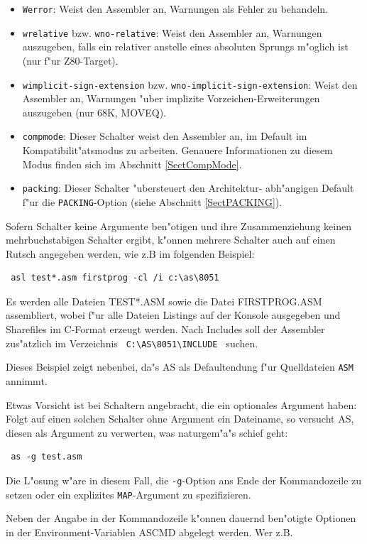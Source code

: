 \documentclass[12pt,a4paper,twoside]{report}
\newcommand{\tty}[1]{{\tt #1}}
\newcommand{\asname}{AS}
\begin{document}
\begin{itemize}
\item{{\tt Werror}: Weist den Assembler an, Warnungen als Fehler zu
      behandeln.}
\item{{\tt wrelative} bzw. {\tt wno-relative}: Weist den Assembler an,
      Warnungen auszugeben, falls ein relativer anstelle eines absoluten
      Sprungs m"oglich ist (nur f"ur Z80-Target).}
\item{{\tt wimplicit-sign-extension} bzw. {\tt wno-implicit-sign-extension}: Weist den
      Assembler an, Warnungen "uber implizite Vorzeichen-Erweiterungen
      auszugeben (nur 68K, MOVEQ).}
\item{\tty{compmode}: Dieser Schalter weist den Assembler an, im Default
      im Kompatibilit"atsmodus zu arbeiten.  Genauere Informationen zu
      diesem Modus finden sich im Abschnitt \ref{SectCompMode}.}
\item{\tty{packing}: Dieser Schalter "ubersteuert den Architektur-
      abh"angigen Default f"ur die {\tt PACKING}-Option (siehe
      Abschnitt \ref{SectPACKING}).}
\end{itemize}
Sofern Schalter keine Argumente ben"otigen und ihre Zusammenziehung
keinen mehrbuchstabigen Schalter ergibt, k"onnen mehrere Schalter
auch auf einen Rutsch angegeben werden, wie z.B im folgenden Beispiel:
\begin{verbatim}
 asl test*.asm firstprog -cl /i c:\as\8051
\end{verbatim}
Es werden alle Dateien TEST*.ASM sowie die Datei FIRSTPROG.ASM
assembliert, wobei f"ur alle Dateien Listings auf der Konsole
ausgegeben und Sharefiles im C-Format erzeugt werden.  Nach Includes
soll der Assembler zus"atzlich im Verzeichnis \verb! C:\AS\8051\INCLUDE !
suchen.
\par
Dieses Beispiel zeigt nebenbei, da"s \asname{} als Defaultendung f"ur Quelldateien
\tty{ASM} annimmt.
\par
Etwas Vorsicht ist bei Schaltern angebracht, die ein optionales Argument
haben: Folgt auf einen solchen Schalter ohne Argument ein Dateiname, so
versucht \asname{}, diesen als Argument zu verwerten, was naturgem"a"s schief
geht:
\begin{verbatim}
 as -g test.asm
\end{verbatim}
Die L"osung w"are in diesem Fall, die \tty{-g}-Option ans Ende der
Kommandozeile zu setzen oder ein explizites \tty{MAP}-Argument zu
spezifizieren.
\par
Neben der Angabe in der Kommandozeile k"onnen dauernd ben"otigte
Optionen in der Environment-Variablen ASCMD abgelegt werden. Wer z.B.
\end{document}
